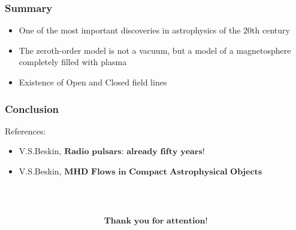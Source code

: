 \documentclass{beamer}
\begin{document}
\begin{frame}
\frametitle{Summary}
\begin{itemize}
    \item One of the most important discoveries in astrophysics of the 20th century
    \item The zeroth-order model is not a vacuum, but a model of a magnetosphere completely filled with plasma
    \item Existence of Open and Closed field lines
\end{itemize}
    
\end{frame}

\begin{frame}
\frametitle{Conclusion}
References:
\begin{itemize}
    \item V.S.Beskin, $\textbf{Radio pulsars: already fifty years!}$
    \item V.S.Beskin, $\textbf{MHD Flows in Compact Astrophysical Objects}$
\end{itemize}

\\
\\

\begin{block}

$$\textbf{Thank you for attention!}$$
\end{block}
\end{frame}
\end{document}
